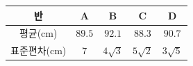 {\renewcommand{\arraystretch}{1.35}\small
\begin{tabular}{|c|c|c|c|c|}
\hline
반 & A & B & C & D \\ \hline
평균(cm) & $89.5$ & $92.1$ & $88.3$ & $90.7$ \\ \hline
표준편차(cm) & $7$ & $4\sqrt{3}$ & $5\sqrt{2}$ & $3\sqrt{5}$ \\ \hline
\end{tabular}}
